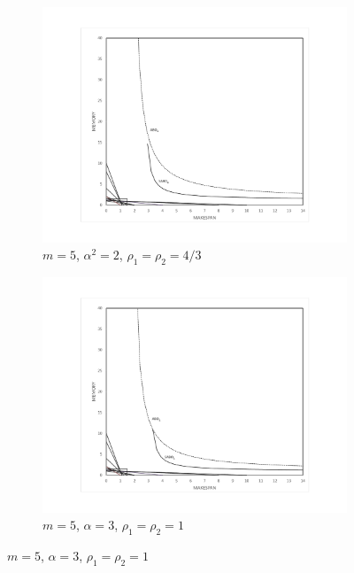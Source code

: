   
   \begin {figure}
      \centering
      \begin{subfigure}[b]{0.5\textwidth}
        \includegraphics[width=\textwidth]{graph_M5_ALPHAsq_2.pdf}
        \caption{$m=5$, $\alpha^2=2$, $\rho_1=\rho_2=4/3$}
        \label{fig:ch5-3.1}
      \end {subfigure} %
      
      \begin{subfigure}[b]{0.5\textwidth}
        \includegraphics[width=\textwidth]{graph_M10_ALPHsq_3_rho_1.pdf}
        \caption{$m=5$, $\alpha=3$, $\rho_1=\rho_2=1$}
        \label{fig:ch5-3.2}
      \end {subfigure} %
      

\end{figure}
